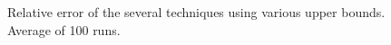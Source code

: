 \begin{figure}[htb]
{}

\caption{Relative error of the several techniques using various upper
  bounds. Average of 100 runs.}
\label{fig:accuracy}
\end{figure}

